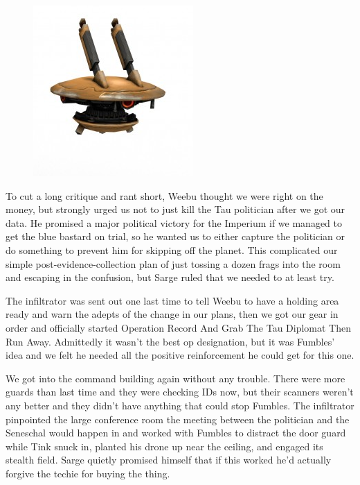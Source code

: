 \begin{figure}
	\begin{center}
		\includegraphics[width=\figwidth]{pics/10/61.png}
	\end{center}
\end{figure}
To cut a long critique and rant short, Weebu thought we were right on the money, but strongly urged us not to just kill the Tau politician after we got our data. 
He promised a major political victory for the Imperium if we managed to get the blue bastard on trial, so he wanted us to either capture the politician or do something to prevent him for skipping off the planet. 
This complicated our simple post-evidence-collection plan of just tossing a dozen frags into the room and escaping in the confusion, but Sarge ruled that we needed to at least try.

The infiltrator was sent out one last time to tell Weebu to have a holding area ready and warn the adepts of the change in our plans, then we got our gear in order and officially started Operation Record And Grab The Tau Diplomat Then Run Away. 
Admittedly it wasn't the best op designation, but it was Fumbles' idea and we felt he needed all the positive reinforcement he could get for this one.

We got into the command building again without any trouble. 
There were more guards than last time and they were checking IDs now, but their scanners weren't any better and they didn't have anything that could stop Fumbles. 
The infiltrator pinpointed the large conference room the meeting between the politician and the Seneschal would happen in and worked with Fumbles to distract the door guard while Tink snuck in, planted his drone up near the ceiling, and engaged its stealth field. 
Sarge quietly promised himself that if this worked he'd actually forgive the techie for buying the thing.

